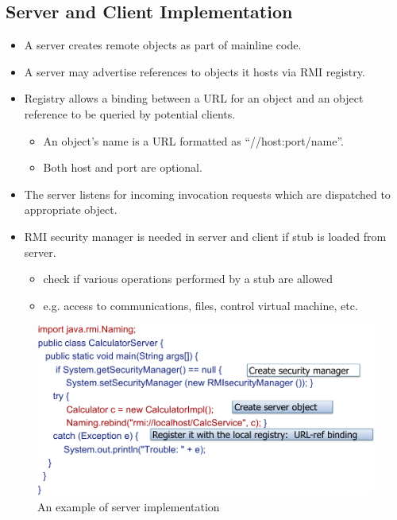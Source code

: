 \documentclass[twocolumn,landscape,10pt]{article}
\theoremstyle{definition}
\begin{document}
\subsection{Server and Client Implementation}

\begin{itemize}
    \item A server creates remote objects as part of mainline code.
    \item A server may advertise references to objects it hosts via
        RMI registry.
    \item Registry allows a binding between a URL for an object and an object
        reference to be queried by potential clients.
        \begin{itemize}
            \item An object's name is a URL formatted as ``//host:port/name''.
            \item Both host and port are optional.
        \end{itemize} 
    \item The server listens for incoming invocation requests which are
        dispatched to appropriate object.
    \item RMI security manager is needed in server and client if stub is loaded
        from server.
        \begin{itemize}
            \item check if various operations performed by a stub are allowed 
            \item e.g. access to communications, files, control virtual machine,
                etc.
        \end{itemize} 
\end{itemize} 

\begin{figure}[h]
  	\includegraphics[scale=0.30]{server.png}
  	\centering
    \caption{An example of server implementation}
\end{figure}
\end{document}
